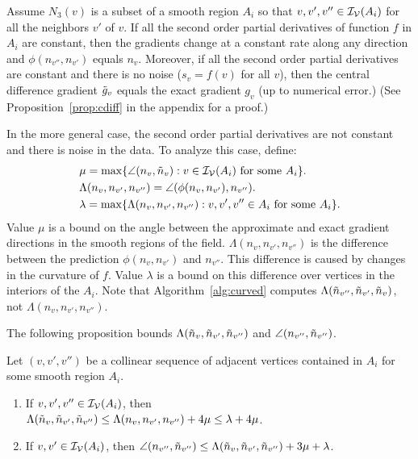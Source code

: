 Assume $N_3(v)$ is a subset of a smooth region $A_i$ 
so that $v, v', v'' \in \mathcal{I_V}(A_i)$ for all the neighbors $v'$ of $v$.
If all the second order partial derivatives of function $f$ in $A_i$
are constant,
then the gradients change at a constant rate
along any direction and $\phi(n_{v''},n_{v'})$ equals $n_v$.
Moreover, if all the second order partial derivatives are constant
and there is no noise ($s_v = f(v)$ for all $v$),
then the central difference gradient $\tilde{g}_v$ 
equals the exact gradient $g_v$ (up to numerical error.)
(See Proposition~\ref{prop:cdiff} in the appendix for a proof.)

In the more general case, 
the second order partial derivatives are not constant 
and there is noise in the data.
To analyze this case, define:
\begin{align*}
& \mu = \max\{ \angle(n_v,\tilde{n}_v) : v \in \mathcal{I_V}(A_i) \mbox{ for some } A_i \}.\\
& \Lambda(n_v,n_{v'},n_{v''}) = \angle(\phi(n_v,n_{v'}),n_{v''}).\\
& \lambda = \max\{ \Lambda(n_v, n_{v'},n_{v''}) :
                  v,v',v'' \in A_i \mbox{ for some } A_i \}.
\end{align*}
Value $\mu$ is a bound on the angle 
between the approximate and exact gradient directions
in the smooth regions of the field.
$\Lambda(n_v,n_{v'},n_{v''})$ is the difference 
between the prediction $\phi(n_v,n_{v'})$ and $n_{v''}$.
This difference is caused by changes in the curvature of $f$.
Value $\lambda$ is a bound on this difference 
over vertices in the interiors of the $A_i$.
Note that Algorithm~\ref{alg:curved} 
computes $\Lambda(\tilde{n}_{v''},\tilde{n}_{v'},\tilde{n}_v)$,
not $\Lambda(n_v,n_{v'},n_{v''})$.

The following proposition bounds $\Lambda(\tilde{n}_v,\tilde{n}_{v'},\tilde{n}_{v''})$
and $\angle(n_{v''},\tilde{n}_{v''})$.
\begin{proposition}
Let $(v, v', v'')$ be a collinear sequence of adjacent vertices
contained in $A_i$ for some smooth region $A_i$.
\begin{enumerate}
\item If $v, v', v'' \in \mathcal{I_V}(A_i)$, then\\
{\centering
$\Lambda(\tilde{n}_v, \tilde{n}_{v'}, \tilde{n}_{v''}) \le 
\Lambda(n_v, n_{v'}, n_{v''}) + 4 \mu \le \lambda + 4 \mu$.}
\item If $v, v' \in \mathcal{I_V}(A_i)$, then
$\angle(n_{v''},\tilde{n}_{v''}) \le 
   \Lambda(\tilde{n}_v,\tilde{n}_{v'},\tilde{n}_{v''}) + 3 \mu + \lambda$.
\end{enumerate}
\label{prop:angle}
\end{proposition}

